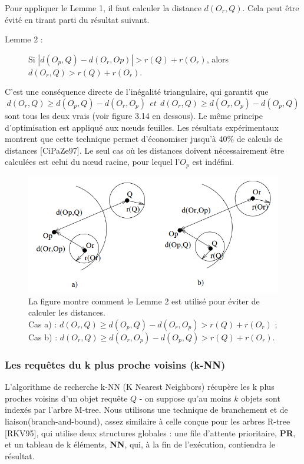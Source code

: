 Pour appliquer le Lemme 1, il faut calculer la distance $ d(O_r, Q) $. Cela peut être évité en tirant parti du résultat suivant.
\begin{description}
	\item[Lemme 2 :]  Si $ | d(O_p, Q) - d(O_r, Op) |> r(Q) + r(O_r) $, alors $ d(O_r, Q) > r(Q) + r(O_r) $.
\end{description}

C'est une conséquence directe de l'inégalité triangulaire, qui garantit que 
\begin{displaymath}
	 d(O_r, Q) \ge d(O_p, Q)-d(O_r, O_p) ~~ et  ~~  d(O_r, Q) \ge d(O_r, O_p)-d(O_p, Q)
\end{displaymath}
  sont tous les deux vrais (voir figure 3.14 en dessous). Le même principe d'optimisation est appliqué aux nœuds feuilles. Les résultats expérimentaux montrent que cette technique permet d'économiser jusqu'à 40\% de calculs de distances [CiPaZe97]. Le seul cas où les distances doivent nécessairement être calculées est celui du nœud racine, pour lequel l'$ O_p $ est indéfini.

\begin{figure}[H]
	\centering
	\includegraphics[width=.6 \textwidth]{Figures/lemme.png} %
	\caption{La figure montre comment le Lemme 2 est utilisé pour éviter de calculer les distances. \\Cas a) : $ d(O_r, Q) \ge d(O_p, Q) - d(O_r, O_p) > r(Q) + r(O_r) $ ; \\
		Cas b) : $ d(O_r, Q) \ge d(O_r, O_p) - d(O_p, Q) > r(Q) + r(O_r) $.}
\end{figure} 

\subsubsection{Les requêtes du k plus proche voisins (k-NN)}

L'algorithme de recherche k-NN (K Nearest Neighbors) récupère les k plus proches voisins d'un objet requête $ Q $ - on suppose qu'au moins $ k $ objets sont indexés par l'arbre M-tree. Nous utilisons une technique de branchement et de liaison(branch-and-bound), assez similaire à celle conçue pour les arbres R-tree [RKV95], qui utilise deux structures globales : une file d'attente prioritaire, \textbf{PR}, et un tableau de k éléments, \textbf{NN}, qui, à la fin de l'exécution, contiendra le résultat.\\

